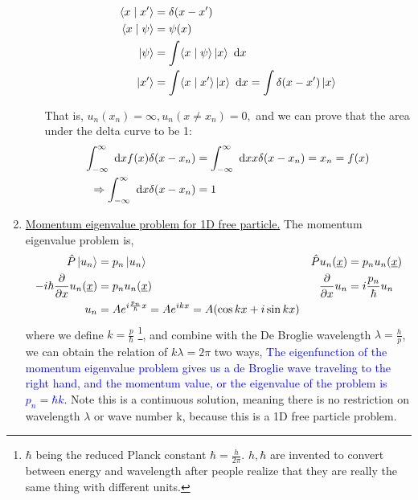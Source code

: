 \documentclass{school-22.101-notes}
\begin{document}
\begin{enumerate}
\begin{enumerate}
    \begin{align}
      \langle x \mid x' \rangle &= \delta (x-x') \\
      \langle x \mid \psi \rangle &= \psi(x) \\
      \left| \psi \right> &= \int \langle x \mid \psi \rangle \left| x \right>  \mbox{ }\mathrm{d} x \\
      \left| x' \right> &= \int \langle x \mid x' \rangle \left| x \right>  \mbox{ }\mathrm{d} x  = \int \delta (x-x') \left| x \right>
    \end{align}


    That is, $u_n(x_n) = \infty, u_n (x\neq x_n) = 0,$ and we can prove that the area under the delta curve to be 1: 
    \begin{align}
      \int_{-\infty}^{\infty} \mbox{ }\mathrm{d} x f(x) \delta(x-x_n) &=  \int_{-\infty}^{\infty} \mbox{ }\mathrm{d} x x \delta(x-x_n) = x_n = f(x) \\
      \Rightarrow \int_{-\infty}^{\infty} \mbox{ }\mathrm{d} x \delta(x-x_n) &= 1 
    \end{align}
  \end{enumerate}

\item \uline{Momentum eigenvalue problem for 1D free particle.} The momentum eigenvalue problem is, 
\begin{align}
  \hat{P} \left| u_n \right> &= p_n \left| u_n \right>  &   \hat{P} u_n(\underline{x}) &= p_n u_n(\underline{x}) \\
  -i\hbar \frac{\partial}{\partial x} u_n(\underline{x}) &= p_n u_n(\underline{x}) &  \frac{\partial}{\partial x} u_n &= i \frac{p_n}{\hbar} u_n   \\
  u_n &= A e^{i \frac{p_n}{\hbar} x} = A e^{ikx} = A (\cos kx + i \sin kx) 
\end{align}
where we define $\boxed{k = \frac{p}{\hbar}}$ \footnote{$\hbar$ being the reduced Planck constant $\hbar = \frac{h}{2\pi}$. $h, \hbar$ are invented to convert between energy and wavelength after people realize that they are really the same thing with different units.}, and combine with the De Broglie wavelength $\lambda = \frac{h}{p}$, we can obtain the relation of $ \boxed{k \lambda = 2 \pi}$ two ways, 
\textcolor{blue}{The eigenfunction of the momentum eigenvalue problem gives us a de Broglie wave traveling to the right hand, and the momentum value, or the eigenvalue of the problem is $p_n = \hbar k$.} Note this is a continuous solution, meaning there is no restriction on wavelength $\lambda$ or wave number k, because this is a 1D free particle problem. 


\end{enumerate}
\end{document}
